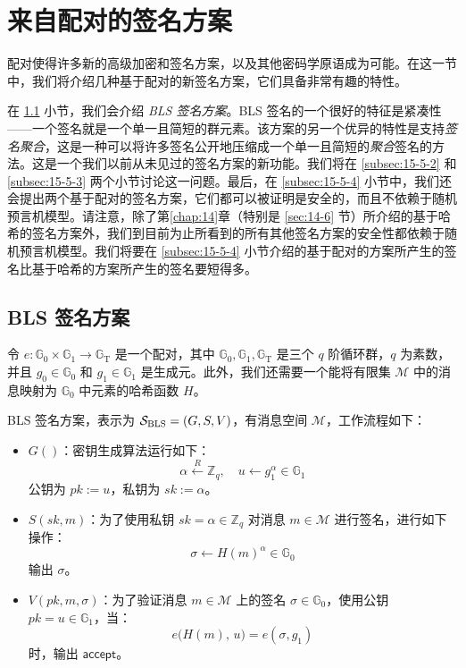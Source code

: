 \section{来自配对的签名方案}\label{sec:15-5}

配对使得许多新的高级加密和签名方案，以及其他密码学原语成为可能。在这一节中，我们将介绍几种基于配对的新签名方案，它们具备非常有趣的特性。

在 \ref{subsec:15-5-1} 小节，我们会介绍 \emph{BLS 签名方案}。BLS 签名的一个很好的特征是紧凑性——一个签名就是一个单一且简短的群元素。该方案的另一个优异的特性是支持\emph{签名聚合}，这是一种可以将许多签名公开地压缩成一个单一且简短的\emph{聚合}签名的方法。这是一个我们以前从未见过的签名方案的新功能。我们将在 \ref{subsec:15-5-2} 和 \ref{subsec:15-5-3} 两个小节讨论这一问题。最后，在 \ref{subsec:15-5-4} 小节中，我们还会提出两个基于配对的签名方案，它们都可以被证明是安全的，而且不依赖于随机预言机模型。请注意，除了第\ref{chap:14}章（特别是 \ref{sec:14-6} 节）所介绍的基于哈希的签名方案外，我们到目前为止所看到的所有其他签名方案的安全性都依赖于随机预言机模型。我们将要在 \ref{subsec:15-5-4} 小节介绍的基于配对的方案所产生的签名比基于哈希的方案所产生的签名要短得多。

\subsection{BLS 签名方案}\label{subsec:15-5-1}

令 $e:\mathbb{G}_0\times\mathbb{G}_1\to\mathbb{G}_\mathrm{T}$ 是一个配对，其中 $\mathbb{G}_0,\mathbb{G}_1,\mathbb{G}_\mathrm{T}$ 是三个 $q$ 阶循环群，$q$ 为素数，并且 $g_0\in\mathbb{G}_0$ 和 $g_1\in\mathbb{G}_1$ 是生成元。此外，我们还需要一个能将有限集 $\mathcal{M}$ 中的消息映射为 $\mathbb{G}_0$ 中元素的哈希函数 $H$。

BLS 签名方案，表示为 $\mathcal{S}_{\rm BLS}=(G,S,V)$，有消息空间 $\mathcal{M}$，工作流程如下：
\begin{itemize}
	\item $G()$：密钥生成算法运行如下：
	\[
		\alpha\stackrel{R}\leftarrow\mathbb{Z}_q,\quad
    	u\leftarrow g_1^\alpha \in \mathbb{G}_1
	\]
	公钥为 $pk:=u$，私钥为 $sk:=\alpha$。
	\item $S(sk,m)$：为了使用私钥 $sk=\alpha\in\mathbb{Z}_q$ 对消息 $m\in\mathcal{M}$ 进行签名，进行如下操作：
	\[
		\sigma\leftarrow H(m)^\alpha\in\mathbb{G}_0
	\]
	输出 $\sigma$。
	\item $V(pk,m,\sigma)$：为了验证消息 $m\in\mathcal{M}$ 上的签名 $\sigma\in\mathbb{G}_0$，使用公钥 $pk=u\in\mathbb{G}_1$，当：
	\[
		e\big(H(m),\,u\big)=e(\sigma,g_1)
	\]
	时，输出 $\mathsf{accept}$。
\end{itemize}

